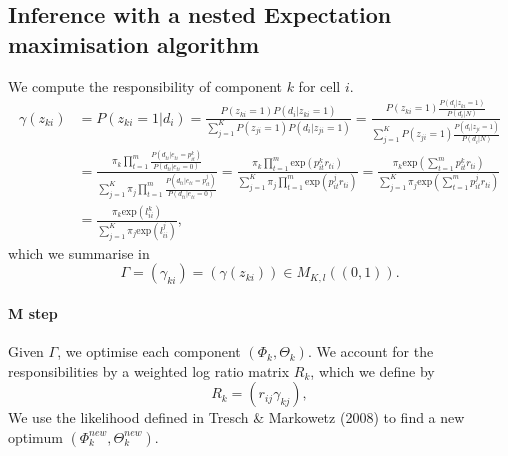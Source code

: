 \documentclass[12pt]{article}
\begin{document}
\subsection{Inference with a nested Expectation maximisation algorithm}
We compute the responsibility of component $k$ for cell $i$.
\begin{align}\label{eq:gammaki}
\gamma(z_{ki}) &= P(z_{ki} = 1|d_i) = \frac{P(z_{ki} = 1)P(d_i|z_{ki} = 1)}{\sum\limits_{j=1}^KP(z_{ji} = 1)P(d_i|z_{ji} = 1)} = \frac{P(z_{ki} = 1)\frac{P(d_i|z_{ki} = 1)}{P(d_i|N)}}{\sum\limits_{j=1}^KP(z_{ji} = 1)\frac{P(d_i|z_{ji} = 1)}{P(d_i|N)}}\nonumber\\
&=   \frac{\pi_k\prod\limits_{t=1}^m\frac{P(d_{ti}|e_{ti} = p_{it}^k)}{P(d_{ti}|e_{ti} = 0)}}{\sum\limits_{j=1}^K\pi_j\prod\limits_{t=1}^m\frac{P(d_{ti}|e_{ti} = p_{it}^j)}{P(d_{ti}|e_{ti} = 0)}} =   \frac{\pi_k\prod\limits_{t=1}^m \mathrm{exp}(p_{it}^kr_{ti})}{\sum\limits_{j=1}^K\pi_j\prod\limits_{t=1}^m\mathrm{exp}(p_{it}^j r_{ti})} = \frac{\pi_k\mathrm{exp}\left(\sum\limits_{t=1}^m p_{it}^k r_{ti}\right)}{\sum\limits_{j=1}^K\pi_j\mathrm{exp}\left(\sum\limits_{t=1}^mp_{it}^j r_{ti}\right)}\nonumber\\
&= \frac{\pi_k \mathrm{exp}\left(l_{ii}^k\right)}{\sum\limits_{j=1}^K\pi_j \mathrm{exp}\left(l_{ii}^j\right)},
\end{align}
which we summarise in
\begin{equation*}
\Gamma = (\gamma_{ki}) = (\gamma(z_{ki})) \in M_{K,l} (\left(0,1\right)).
\end{equation*}
 
\paragraph{M step}
Given $\Gamma$, we optimise each component $(\Phi_k, \Theta_k)$. We account for the responsibilities by a weighted log ratio matrix $R_k$, which we define by
\begin{equation*}
R_k = ( r_{ij} \gamma_{kj} ),%
\end{equation*}
 We use the likelihood defined in Tresch \& Markowetz (2008) to find a new optimum $\left(\Phi_k^{new}, \Theta_k^{new}\right)$.
\end{document}
